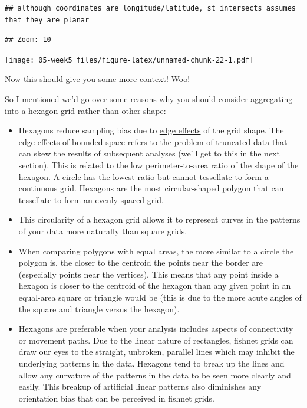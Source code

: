 \documentclass[]{book}
\providecommand{\tightlist}{%
  \setlength{\itemsep}{0pt}\setlength{\parskip}{0pt}}
\begin{document}
\begin{verbatim}
## although coordinates are longitude/latitude, st_intersects assumes that they are planar
\end{verbatim}

\begin{verbatim}
## Zoom: 10
\end{verbatim}

\texttt{[image: 05-week5\_files/figure-latex/unnamed-chunk-22-1.pdf]}

Now this should give you some more context! Woo!

So I mentioned we'd go over some reasons why you should consider aggregating into a hexagon grid rather than other shape:

\begin{itemize}
\tightlist
\item
  Hexagons reduce sampling bias due to \href{https://link.springer.com/chapter/10.1007/978-0-387-09688-9_5}{edge effects} of the grid shape. The edge effects of bounded space refers to the problem of truncated data that can skew the results of subsequent analyses (we'll get to this in the next section). This is related to the low perimeter-to-area ratio of the shape of the hexagon. A circle has the lowest ratio but cannot tessellate to form a continuous grid. Hexagons are the most circular-shaped polygon that can tessellate to form an evenly spaced grid.
\item
  This circularity of a hexagon grid allows it to represent curves in the patterns of your data more naturally than square grids.
\item
  When comparing polygons with equal areas, the more similar to a circle the polygon is, the closer to the centroid the points near the border are (especially points near the vertices). This means that any point inside a hexagon is closer to the centroid of the hexagon than any given point in an equal-area square or triangle would be (this is due to the more acute angles of the square and triangle versus the hexagon).
\item
  Hexagons are preferable when your analysis includes aspects of connectivity or movement paths. Due to the linear nature of rectangles, fishnet grids can draw our eyes to the straight, unbroken, parallel lines which may inhibit the underlying patterns in the data. Hexagons tend to break up the lines and allow any curvature of the patterns in the data to be seen more clearly and easily. This breakup of artificial linear patterns also diminishes any orientation bias that can be perceived in fishnet grids.

\end{itemize}
\end{document}
